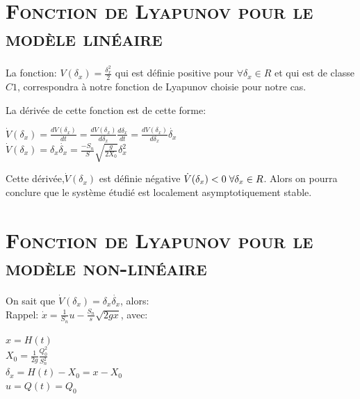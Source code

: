 \section{\textsc{Fonction de Lyapunov pour le modèle linéaire}}

	\paragraph{}
	La fonction: $V(\delta_x)=\frac{\delta_x^2}{2}$ qui est définie positive pour $\forall \delta_x \in R $ et qui est de classe $C1$, correspondra à notre fonction de Lyapunov choisie pour notre cas.\\

	\par	 La dérivée de cette fonction est de cette forme: 
	\begin{center}
		$\dot{V}(\delta_x) = \frac{dV(\delta_x)}{dt} = \frac{dV(\delta_x)}{d\delta_x} \frac{d\delta_x}{dt} = \frac{dV(\delta_x)}{d\delta_x} \dot{\delta_x} $\\[0.25 cm]
		$ \dot{V}(\delta_x) = \delta_x \dot{\delta_x} = \frac{-S_n}{S} \sqrt{\frac{g}{2X_0}} \delta_x^2 $\\[0.25 cm]
	\end{center} 
	\par Cette dérivée,$\dot{V}(\delta_x)$ est définie négative $\dot{V}(\delta_x)<0 \hspace{1mm} \forall \delta_x \in R $. Alors on pourra conclure que le système étudié est localement asymptotiquement stable.
	
\break
\section{\textsc{Fonction de Lyapunov pour le modèle non-linéaire}}
		
		\par On sait que  $\dot{V}(\delta_x) = \delta_x \dot{\delta_x} $, alors:\\

		Rappel: $ \dot{x}=\frac{1}{S_n} u - \frac{S_n}{s} \sqrt{2 g x}$, avec:
		\begin{center}
		 $ x = H(t)$ \\[0.25 cm]
		 $ X_0 = \frac{1}{2g} \frac{Q^2_0}{S^2_n}$ \\[0.25 cm]
		 $ \delta_x = H(t)-X_0 = x-X_0 $ \\[0.25 cm]
		 $ u = Q(t) = Q_0 $
		\end{center}
		
